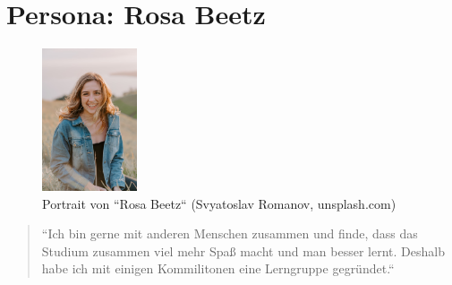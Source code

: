 \documentclass{article}
\begin{document}
\newpage

\section{Persona: Rosa Beetz}

\begin{figure}[h]
	\includegraphics[width=0.25\textwidth]{rosa}
	\centering
	\caption{Portrait von ``Rosa Beetz`` (Svyatoslav Romanov, unsplash.com)}
\end{figure}

\begin{quote}
	\large{``Ich bin gerne mit anderen Menschen zusammen und finde, dass das Studium
		zusammen viel mehr Spaß macht und man besser lernt. Deshalb habe ich mit einigen
		Kommilitonen eine Lerngruppe gegründet.``}
\end{quote}
\end{document}
